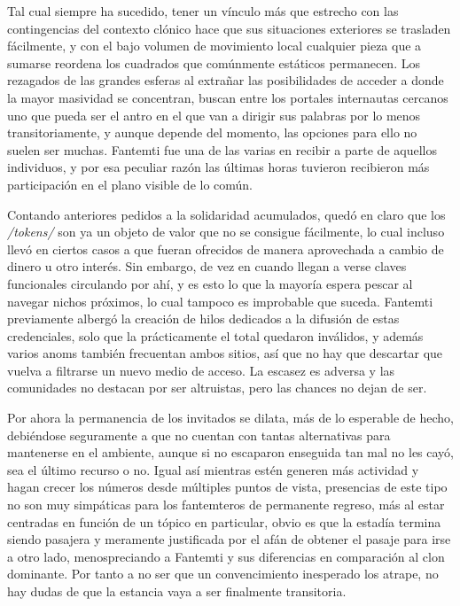 \documentclass[
]{book}
\begin{document}
Tal cual siempre ha sucedido, tener un vínculo más que estrecho con las contingencias del contexto clónico hace que sus situaciones exteriores se trasladen fácilmente, y con el bajo volumen de movimiento local cualquier pieza que a sumarse reordena los cuadrados que comúnmente estáticos permanecen. Los rezagados de las grandes esferas al extrañar las posibilidades de acceder a donde la mayor masividad se concentran, buscan entre los portales internautas cercanos uno que pueda ser el antro en el que van a dirigir sus palabras por lo menos transitoriamente, y aunque depende del momento, las opciones para ello no suelen ser muchas. Fantemti fue una de las varias en recibir a parte de aquellos individuos, y por esa peculiar razón las últimas horas tuvieron recibieron más participación en el plano visible de lo común.

Contando anteriores pedidos a la solidaridad acumulados, quedó en claro que los \emph{/tokens/} son ya un objeto de valor que no se consigue fácilmente, lo cual incluso llevó en ciertos casos a que fueran ofrecidos de manera aprovechada a cambio de dinero u otro interés. Sin embargo, de vez en cuando llegan a verse claves funcionales circulando por ahí, y es esto lo que la mayoría espera pescar al navegar nichos próximos, lo cual tampoco es improbable que suceda. Fantemti previamente albergó la creación de hilos dedicados a la difusión de estas credenciales, solo que la prácticamente el total quedaron inválidos, y además varios anoms también frecuentan ambos sitios, así que no hay que descartar que vuelva a filtrarse un nuevo medio de acceso. La escasez es adversa y las comunidades no destacan por ser altruistas, pero las chances no dejan de ser.

Por ahora la permanencia de los invitados se dilata, más de lo esperable de hecho, debiéndose seguramente a que no cuentan con tantas alternativas para mantenerse en el ambiente, aunque si no escaparon enseguida tan mal no les cayó, sea el último recurso o no. Igual así mientras estén generen más actividad y hagan crecer los números desde múltiples puntos de vista, presencias de este tipo no son muy simpáticas para los fantemteros de permanente regreso, más al estar centradas en función de un tópico en particular, obvio es que la estadía termina siendo pasajera y meramente justificada por el afán de obtener el pasaje para irse a otro lado, menospreciando a Fantemti y sus diferencias en comparación al clon dominante. Por tanto a no ser que un convencimiento inesperado los atrape, no hay dudas de que la estancia vaya a ser finalmente transitoria.
\end{document}
